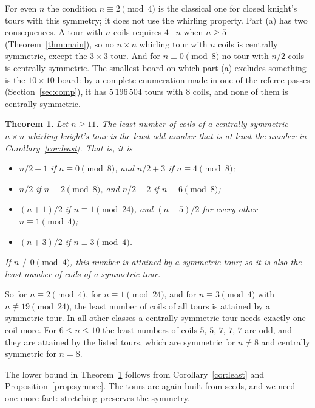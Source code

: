 \documentclass[11pt]{amsart}
\newtheorem{theorem}{Theorem}
\theoremstyle{remark}
\begin{document}
For even $n$ the condition $n\equiv2\pmod 4$ is the classical one for closed knight's tours with this symmetry; it
does not use the whirling property. Part (a) has two consequences. A tour with $n$ coils requires $4\mid n$ when
$n\ge5$ (Theorem~\ref{thm:main}), so no $n\times n$ whirling tour with $n$ coils is centrally symmetric, except the
$3\times3$ tour. And for $n\equiv0\pmod 8$ no tour with $n/2$ coils is centrally symmetric. The smallest board on
which part (a) excludes something is the $10\times10$ board: by a complete enumeration made in one of the referee
passes (Section~\ref{sec:comp}), it has $5\,196\,504$ tours with $8$ coils, and none of them is centrally symmetric.

\begin{theorem}\label{thm:sym}
Let $n\ge11$. The least number of coils of a centrally symmetric $n\times n$ whirling knight's tour is the least odd
number that is at least the number in Corollary~\ref{cor:least}. That is, it is
\begin{itemize}
\item $n/2+1$ if $n\equiv0\pmod 8$, and $n/2+3$ if $n\equiv4\pmod 8$;
\item $n/2$ if $n\equiv2\pmod 8$, and $n/2+2$ if $n\equiv6\pmod 8$;
\item $(n+1)/2$ if $n\equiv1\pmod{24}$, and $(n+5)/2$ for every other $n\equiv1\pmod 4$;
\item $(n+3)/2$ if $n\equiv3\pmod 4$.
\end{itemize}
If $n\not\equiv0\pmod 4$, this number is attained by a symmetric tour; so it is also the least number of coils of a
symmetric tour.
\end{theorem}
So for $n\equiv2\pmod 4$, for $n\equiv1\pmod{24}$, and for $n\equiv3\pmod 4$ with $n\not\equiv19\pmod{24}$, the
least number of coils of all tours is attained by a symmetric tour. In all other classes a centrally symmetric tour
needs exactly one coil more. For $6\le n\le10$ the least numbers of coils $5$, $5$, $7$, $7$, $7$ are odd, and they
are attained by the listed tours, which are symmetric for $n\ne8$ and centrally symmetric for $n=8$.

The lower bound in Theorem~\ref{thm:sym} follows from Corollary~\ref{cor:least} and
Proposition~\ref{prop:symnec}. The tours are again built from seeds, and we need one more fact: stretching preserves
the symmetry.
\end{document}
